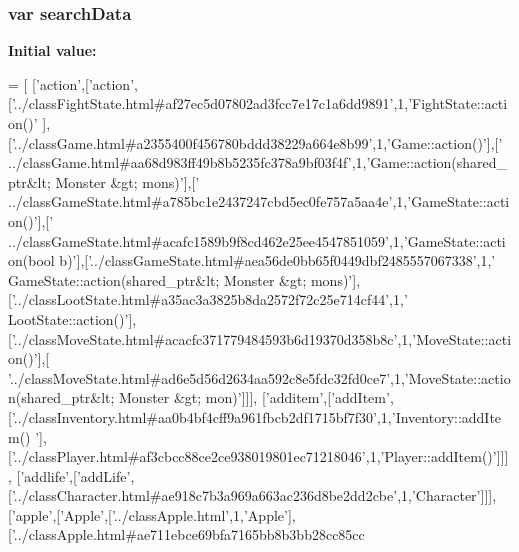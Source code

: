 \subsubsection[{search\-Data}]{\setlength{\rightskip}{0pt plus 5cm}var search\-Data}\label{all__1_8js_ad01a7523f103d6242ef9b0451861231e}
{\bfseries Initial value\-:}
\begin{DoxyCode}
=
[
  [\textcolor{stringliteral}{'action'},[\textcolor{stringliteral}{'action'},[\textcolor{stringliteral}{'../classFightState.html#af27ec5d07802ad3fcc7e17c1a6dd9891'},1,\textcolor{stringliteral}{'FightState::action()'}
      ],[\textcolor{stringliteral}{'../classGame.html#a2355400f456780bddd38229a664e8b99'},1,\textcolor{stringliteral}{'Game::action()'}],[\textcolor{stringliteral}{'
      ../classGame.html#aa68d983ff49b8b5235fc378a9bf03f4f'},1,\textcolor{stringliteral}{'Game::action(shared\_ptr&lt; Monster &gt; mons)'}],[\textcolor{stringliteral}{'
      ../classGameState.html#a785bc1e2437247cbd5ec0fe757a5aa4e'},1,\textcolor{stringliteral}{'GameState::action()'}],[\textcolor{stringliteral}{'
      ../classGameState.html#acafc1589b9f8cd462e25ee4547851059'},1,\textcolor{stringliteral}{'GameState::action(bool b)'}],[\textcolor{stringliteral}{'../classGameState.html#aea56de0bb65f0449dbf2485557067338'},1,\textcolor{stringliteral}{'
      GameState::action(shared\_ptr&lt; Monster &gt; mons)'}],[\textcolor{stringliteral}{'../classLootState.html#a35ac3a3825b8da2572f72c25e714cf44'},1,\textcolor{stringliteral}{'
      LootState::action()'}],[\textcolor{stringliteral}{'../classMoveState.html#acacfc371779484593b6d19370d358b8c'},1,\textcolor{stringliteral}{'MoveState::action()'}],[\textcolor{stringliteral}{
      '../classMoveState.html#ad6e5d56d2634aa592c8e5fdc32fd0ce7'},1,\textcolor{stringliteral}{'MoveState::action(shared\_ptr&lt; Monster &gt;
       mon)'}]]],
  [\textcolor{stringliteral}{'additem'},[\textcolor{stringliteral}{'addItem'},[\textcolor{stringliteral}{'../classInventory.html#aa0b4bf4cff9a961fbcb2df1715bf7f30'},1,\textcolor{stringliteral}{'Inventory::addItem()
      '}],[\textcolor{stringliteral}{'../classPlayer.html#af3cbcc88ce2ce938019801ec71218046'},1,\textcolor{stringliteral}{'Player::addItem()'}]]],
  [\textcolor{stringliteral}{'addlife'},[\textcolor{stringliteral}{'addLife'},[\textcolor{stringliteral}{'../classCharacter.html#ae918c7b3a969a663ac236d8be2dd2cbe'},1,\textcolor{stringliteral}{'Character'}]]],
  [\textcolor{stringliteral}{'apple'},[\textcolor{stringliteral}{'Apple'},[\textcolor{stringliteral}{'../classApple.html'},1,\textcolor{stringliteral}{'Apple'}],[\textcolor{stringliteral}{'../classApple.html#ae711ebce69bfa7165bb8b3bb28cc85cc
}
\end{DoxyCode}
